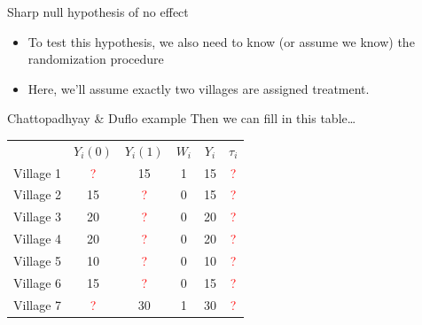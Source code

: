 \documentclass[xcolor={dvipsnames},handout]{beamer}
\begin{document}

\begin{frame}{Sharp null hypothesis of no effect}

\begin{itemize}
\item To test this hypothesis, we also need to know (or assume we know) the randomization procedure
\item Here, we'll assume exactly two villages are assigned treatment.
\end{itemize}

\end{frame}



\begin{frame}{Chattopadhyay \& Duflo example}
Then we can fill in this table\dots

\begin{table}[]
\begin{tabular}{lccccc}
& $Y_i(0)$ & $Y_i(1)$ & $W_i$ & $Y_i$ & $\tau_i$ \\
Village 1 & \textcolor{red}{?} & 15 & 1 & 15 & \textcolor{red}{?} \\
Village 2 & 15 & \textcolor{red}{?} & 0 & 15 & \textcolor{red}{?} \\
Village 3 & 20 & \textcolor{red}{?} & 0 & 20 & \textcolor{red}{?} \\
Village 4 & 20 & \textcolor{red}{?} & 0 & 20 & \textcolor{red}{?} \\
Village 5 & 10 & \textcolor{red}{?} & 0 & 10 & \textcolor{red}{?} \\
Village 6 & 15 & \textcolor{red}{?} & 0 & 15 & \textcolor{red}{?} \\
Village 7 & \textcolor{red}{?} & 30 & 1 & 30 & \textcolor{red}{?}
\end{tabular}
\end{table}

\end{frame}
\end{document}

